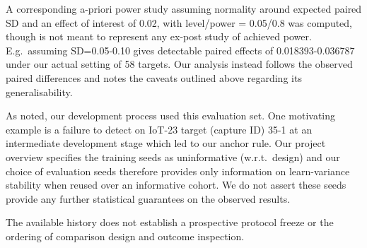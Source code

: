 A corresponding a-priori power study assuming normality around expected paired SD and an effect of interest of 0.02, with level/power = 0.05/0.8 was computed, though is not meant to represent any ex-post study of achieved power. E.g.\ assuming SD=0.05-0.10 gives detectable paired effects of 0.018393-0.036787 under our actual setting of 58 targets. Our analysis instead follows the observed paired differences and notes the caveats outlined above regarding its generalisability.

As noted, our development process used this evaluation set. One motivating example is a failure to detect on IoT-23 target (capture ID) 35-1 at an intermediate development stage which led to our anchor rule. Our project overview specifies the training seeds as uninformative (w.r.t.\ design) and our choice of evaluation seeds therefore provides only information on learn-variance stability when reused over an informative cohort. We do not assert these seeds provide any further statistical guarantees on the observed results.

The available history does not establish a prospective protocol freeze or the ordering of comparison design and outcome inspection.
